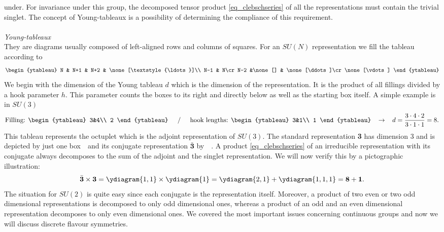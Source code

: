 under. For invariance under this group, the decomposed tensor product \eqref{eq_clebschseries} of all the representations must contain the trivial
singlet. The concept of Young-tableaux is a possibility of determining the compliance of this requirement. 
\\ \\ \textit{Young-tableaux}\\
\noindent They are diagrams usually composed of left-aligned rows and columns of squares. For an $SU(N)$ representation we fill the tableau according
to
\begingroup\makeatletter\def\f@size{5}\check@mathfonts\def\maketag@@@#1{\hbox{\m@th\large\normalfont#1}}
\begin{align*}
\begin{ytableau}
N & N+1 & N+2 & \none[\textstyle{\ldots}]\\
N-1 & N\cr
N-2 &\none[] & \none[\ddots]\cr
\none[\vdots]
\end{ytableau}
\end{align*}\endgroup
We begin with the dimension of the Young tableau $d$ which is the dimension of the representation. It is the product of all fillings 
divided by a hook parameter $h$. This parameter counts the boxes to its right and directly below as well as the starting
box itself. A simple example is in $SU(3)$
\begin{align*}
\text{Filling: }\begin{ytableau}
 3&4\\
 2
\end{ytableau}\hspace{0.5cm}/\hspace{0.5cm} \text{hook lengths: }\begin{ytableau}
 3&1\\
 1
\end{ytableau}\hspace{0.3cm}\rightarrow\hspace{0.3cm} d = \frac{3\cdot4\cdot2}{3\cdot 1\cdot 1} = 8.
\end{align*}
This tableau represents the octuplet which is the adjoint representation of $SU(3)$. The standard representation \textbf{3} has dimension 3 and is 
depicted by just one box \,\, and its conjugate representation $\bar{\textbf{3}}$ by \, \,. A product 
\eqref{eq_clebschseries} of an irreducible
representation with its conjugate always decomposes to the sum of the adjoint and the singlet representation. We will now verify this by a 
pictographic illustration:
\begin{align*}
 \bar{\textbf{3}} \times \textbf{3} = \ydiagram{1,1}\times\ydiagram{1} =\ydiagram{2,1} + \ydiagram{1,1,1} = \textbf{8} + \textbf{1}.
\end{align*}
The situation for $SU(2)$ is quite easy since each conjugate is the representation itself. Moreover, a product of two even or two odd dimensional
representations is decomposed to only odd dimensional ones, whereas a product of an odd and an even dimensional representation decomposes to only
even dimensional ones. We covered the most important issues concerning continuous groups and now we will discuss discrete flavour symmetries.



